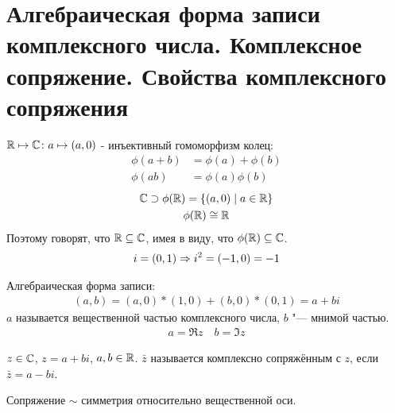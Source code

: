\section{Алгебраическая форма записи комплексного числа. Комплексное сопряжение. Свойства комплексного сопряжения}

$\mathbb{R} \mapsto \mathbb{C}\colon a \mapsto (a, 0)$ - инъективный гомоморфизм колец:
\begin{align*}
	\phi(a+b) &= \phi(a) + \phi(b) \\
	\phi(ab) &= \phi(a) \phi(b)
\end{align*}
\begin{gather*}
\mathbb{C} \supset \phi(\mathbb{R}) = \{(a, 0) \mid a \in \mathbb{R}\} \\
\phi(\mathbb{R}) \cong \mathbb{R}
\end{gather*}
Поэтому говорят, что $\mathbb{R} \subseteq \mathbb{C}$, имея в виду, что $\phi(\mathbb{R}) \subseteq \mathbb{C}$.
\begin{gather*}
i = (0, 1) \Rightarrow i^2 = (-1, 0) = -1
\end{gather*}
\begin{Def}
Алгебраическая форма записи:
\begin{gather*}
(a, b) = (a, 0)*(1, 0) + (b, 0)*(0, 1) = a + bi
\end{gather*}
$a$ называется вещественной частью комплексного числа, $b$ "--- мнимой частью.
\begin{gather*}
a = \Re z \quad b = \Im z
\end{gather*}
\end{Def}

\begin{Def}
$z \in \mathbb{C}$, $z = a + bi$, $a, b \in \mathbb{R}$. $\bar z$ называется комплексно сопряжённым с $z$, если $\bar z = a - bi$.
\end{Def}
\begin{Rem}
Сопряжение $\sim$ симметрия относительно вещественной оси.
\begin{center}
\def\svgwidth{6.0cm}

\end{center}
\end{Rem}

